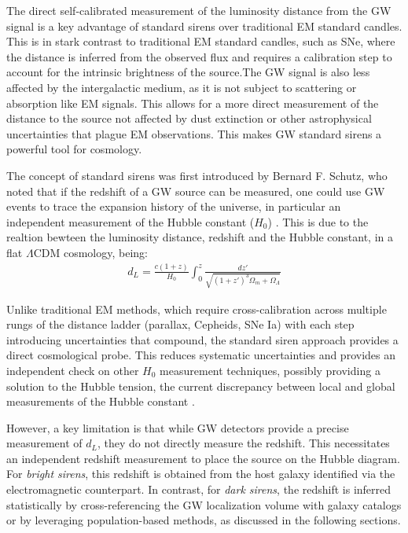 The direct self-calibrated measurement of the luminosity distance from the \ac{GW} signal is a key advantage of standard sirens over traditional \ac{EM} standard candles. This is in stark contrast to traditional \ac{EM} standard candles, such as \ac{SNe}, where the distance is inferred from the observed flux and requires a calibration step to account for the intrinsic brightness of the source.The \ac{GW} signal is also less affected by the intergalactic medium, as it is not subject to scattering or absorption like \ac{EM} signals. This allows for a more direct measurement of the distance to the source not affected by dust extinction or other astrophysical uncertainties that plague \ac{EM} observations. This makes \ac{GW} standard sirens a powerful tool for cosmology.

The concept of standard sirens was first introduced by Bernard F. Schutz, who noted that if the redshift of a \ac{GW} source can be measured, one could use \ac{GW} events to trace the  expansion history of the universe, in particular an independent measurement of the Hubble constant ($H_0$) \citep{schutz1986determining}. This is due to the realtion bewteen the luminosity distance, redshift and the Hubble constant, in a flat \(\Lambda\)CDM cosmology, being:
\begin{align}
    d_L = \frac{c(1+z)}{H_0} \int_0^z \frac{dz'}{\sqrt{(1+z')^3\Omega_m + \Omega_\Lambda}}
\end{align}

Unlike traditional \ac{EM} methods, which require cross-calibration across multiple rungs of the distance ladder (parallax, Cepheids, SNe Ia) with each step introducing uncertainties that compound, the standard siren approach provides a direct cosmological probe. This reduces systematic uncertainties and provides an independent check on other $H_0$ measurement techniques, possibly providing a solution to the Hubble tension, the current discrepancy between local and global measurements of the Hubble constant \citep{Riess:2019cxk,Planck:2018vyg}.

However, a key limitation is that while \ac{GW} detectors provide a precise measurement of $d_L$, they do not directly measure the redshift. This necessitates an independent redshift measurement to place the source on the Hubble diagram. For \textit{bright sirens}, this redshift is obtained from the host galaxy identified via the electromagnetic counterpart. In contrast, for \textit{dark sirens}, the redshift is inferred statistically by cross-referencing the \ac{GW} localization volume with galaxy catalogs or by leveraging population-based methods, as discussed in the following sections.

